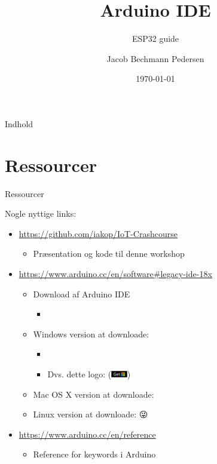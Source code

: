 \documentclass[aspectratio=169]{beamer}
\title{Arduino IDE}
\subtitle{ESP32 guide}
\author{Jacob Bechmann Pedersen}
\institute{Bechmann Engineering ApS}
\date{\today}
\begin{document}
\begin{frame}
	\titlepage
\end{frame}

\begin{frame}{Indhold}
		\begin{fitBox}
			\tableofcontents{}
		\end{fitBox}
\end{frame}

\section{Ressourcer}
\begin{frame}{Ressourcer}
	\begin{textBox}
	Nogle nyttige links:
		\begin{itemize}
			\item \url{https://github.com/iakop/IoT-Crashcourse}
			\begin{itemize}
				\item Præsentation og kode til denne workshop
			\end{itemize}
			\item \url{https://www.arduino.cc/en/software\#legacy-ide-18x}
			\begin{itemize}
				\item Download af Arduino IDE 
				\begin{itemize}
					\item {}
				\end{itemize}
				\item Windows version at downloade:  
				\begin{itemize}
					\item {}
					\item Dvs.  dette logo: (\includegraphics[height=8pt, keepaspectratio=true]{assets/pictures/windows-get.png})
				\end{itemize}
				\item Mac OS X version at downloade:  
				\item Linux version at downloade: \color{arduinoBlue}😜%
			\end{itemize}
			\item \url{https://www.arduino.cc/en/reference}
			\begin{itemize}
				\item Reference for keywords i Arduino
			\end{itemize}
		\end{itemize}
	\end{textBox}
\end{frame}
\end{document}
